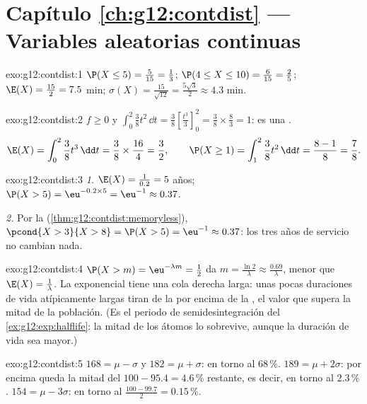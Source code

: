 \section*{Capítulo \ref{ch:g12:contdist} --- Variables aleatorias continuas}

\begin{solution}{exo:g12:contdist:1}
$\P(X \leq 5) = \frac{5}{15} = \frac13$;
$\P(4 \leq X \leq 10) = \frac{6}{15} = \frac25$;
$\E(X) = \frac{15}{2} = 7.5$ min;
$\sigma(X) = \frac{15}{\sqrt{12}} = \frac{5\sqrt3}{2} \approx 4.3$ min.
\end{solution}

\begin{solution}{exo:g12:contdist:2}
$f \geq 0$ y
$\int_0^2 \frac38 t^2\,\dd t = \frac38\left[\frac{t^3}{3}\right]_0^2
= \frac38 \times \frac83 = 1$: es una .
\[
\E(X) = \int_0^2 \frac38 t^3\,\dd t = \frac38 \times \frac{16}{4} = \frac32,
\qquad
\P(X \geq 1) = \int_1^2 \frac38 t^2\,\dd t = \frac{8 - 1}{8} = \frac78 .
\]
\end{solution}

\begin{solution}{exo:g12:contdist:3}
\emph{1.} $\E(X) = \frac{1}{0.2} = 5$ años;
$\P(X > 5) = \eu^{-0.2\times5} = \eu^{-1} \approx 0.37$.

\emph{2.} Por la  (\cref{thm:g12:contdist:memoryless}),
$\pcond{X > 3}{X > 8} = \P(X > 5) = \eu^{-1} \approx 0.37$: los tres años
de servicio no cambian nada.
\end{solution}

\begin{solution}{exo:g12:contdist:4}
$\P(X > m) = \eu^{-\lambda m} = \frac12$ da
$m = \frac{\ln 2}{\lambda} \approx \frac{0.69}{\lambda}$, menor que
$\E(X) = \frac1\lambda$. La  exponencial tiene una cola derecha
larga: unas pocas duraciones de vida atípicamente largas tiran de la
\emph{} por encima de la \emph{}, el valor que supera la mitad
de la población. (Es el periodo de semidesintegración del
\cref{ex:g12:exp:halflife}: la mitad de los átomos lo sobrevive, aunque la
duración de vida  sea mayor.)
\end{solution}

\begin{solution}{exo:g12:contdist:5}
$168 = \mu - \sigma$ y $182 = \mu + \sigma$: en torno al $68\,\%$.
$189 = \mu + 2\sigma$: por encima queda la mitad del
$100 - 95.4 = 4.6\,\%$ restante, es decir, en torno al $2.3\,\%$.
$154 = \mu - 3\sigma$: en torno al $\frac{100 - 99.7}{2} = 0.15\,\%$.
\end{solution}

